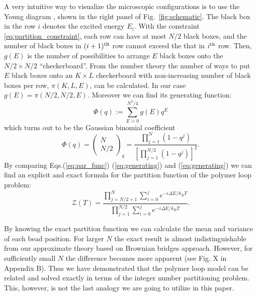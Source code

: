 \documentclass[aps,showpacs,twocolumn,floatfix,prx,superscriptaddress]{revtex4-1}
\begin{document}
A very intuitive way to visualize the microscopic configurations is to use the
Young diagram \cite{andrews1998theory}, shown in the right panel of
Fig.~\ref{fig:schematic}. The black box in the row $i$ denotes the excited
energy $E_i$. With the constraint \eqref{eq:partition_constraint}, each row can
have at most $N/2$ black boxes, and the number of black boxes in $(i+1)^{\rm
    th}$ row cannot exceed the that in $i^{\rm th}$ row.  Then, $g(E)$ is the
number of possibilities to arrange $E$ black boxes onto the $N/2 \times N/2$
``checkerboard''. From the number theory \cite{andrews1998theory} the number of
ways to put $E$ black boxes onto an $K \times L$ checkerboard with
non-increasing number of black boxes per row, $\pi (K,L,E)$, can be calculated.
In our case $g(E)=\pi\left(N/2,N/2,E\right)$. Moreover we can find its
generating function:
\begin{equation}
\Phi (q) := \sum_{E=0}^{N^2/4} g(E) q^E
\label{eq:generating}
\end{equation}
which turns out to be the Gaussian binomial coefficient
\begin{equation}
\Phi (q) = \left(\begin{array}{c} N \\ N/2 \end{array}\right)_q = \frac{\prod_{j=1}^{N} \left(1-q^j\right)}{\left[\prod_{j=1}^{N/2} \left(1-q^j\right)\right]^2}.
\label{eq:binomial}
\end{equation}
By comparing Eqs.(\ref{eq:par_func}) (\ref{eq:generating}) and
(\ref{eq:generating}) we can find an explicit and exact formula for the
partition function of the polymer loop problem:
\begin{equation}
\mathcal{Z}\left(T\right) = \frac{\prod_{j=N/2+1}^{N} \sum_{i=0}^{j}e^{-i\Delta E/k_{B}T}}{\prod_{j=1}^{N/2} \sum_{i=0}^{j}e^{-i\Delta E/k_{B}T}}.
\label{eq:par_func_exact}
\end{equation}

By knowing the exact partition function we can calculate the mean and variance
of each bead position. For larger $N$ the exact result is almost
indistinguishable from our approximate theory based on Brownian bridges
approach. However, for sufficiently small $N$ the difference becomes more
apparent (see Fig. X in Appendix B). Thus we have demonstrated that the polymer
loop model can be related and solved exactly in terms of the integer number
partitioning problem. This, however, is not the last analogy we are going to
utilize in this paper.
\end{document}
